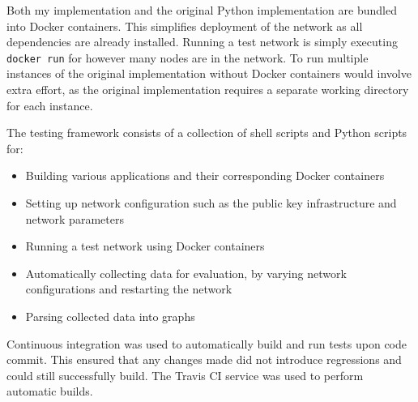 \documentclass[final,dissertation.tex]{subfiles}
\begin{document}
Both my implementation and the original Python implementation are bundled into Docker containers. This simplifies deployment of the network as all dependencies are already installed. Running a test network is simply executing \verb|docker run| for however many nodes are in the network. To run multiple instances of the original implementation without Docker containers would involve extra effort, as the original implementation requires a separate working directory for each instance.

The testing framework consists of a collection of shell scripts and Python scripts for:

\begin{itemize}
	\item Building various applications and their corresponding Docker containers
	\item Setting up network configuration such as the public key infrastructure and network parameters
	\item Running a test network using Docker containers
	\item Automatically collecting data for evaluation, by varying network configurations and restarting the network
	\item Parsing collected data into graphs
\end{itemize}

Continuous integration was used to automatically build and run tests upon code commit. This ensured that any changes made did not introduce regressions and could still successfully build. The Travis CI service was used to perform automatic builds.


%
%
%
%
\end{document}
